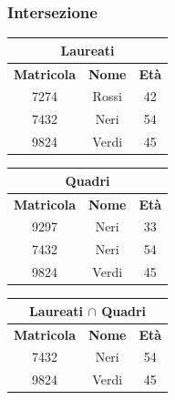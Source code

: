 \documentclass[../main.tex]{subfiles}
\begin{document}
	\subsubsection{Intersezione}
	\begin{center}
		\begin{tabular}{|c|c|c|}
			\hline
			\multicolumn{3}{|c|}{\textbf{Laureati}}\\
			\hline
			\textbf{Matricola} & \textbf{Nome} & \textbf{Età}\\
			\hline
			7274 & Rossi & 42\\
			7432 & Neri & 54\\
			9824 & Verdi & 45\\
			\hline 
		\end{tabular}
		\begin{tabular}{|c|c|c|}
			\hline
			\multicolumn{3}{|c|}{\textbf{Quadri}}\\
			\hline
			\textbf{Matricola} & \textbf{Nome} & \textbf{Età}\\
			\hline
			9297 & Neri & 33\\
			7432 & Neri & 54\\
			9824 & Verdi & 45\\
			\hline
		\end{tabular}
	\end{center}
	\begin{center}
		\begin{tabular}{|c|c|c|}
			\hline
			\multicolumn{3}{|c|}{\textbf{Laureati $\cap$ Quadri}}\\
			\hline
			\textbf{Matricola} & \textbf{Nome} & \textbf{Età}\\
			\hline
			7432 & Neri & 54\\
			9824 & Verdi & 45\\
			\hline
		\end{tabular}
	\end{center}
\end{document}
